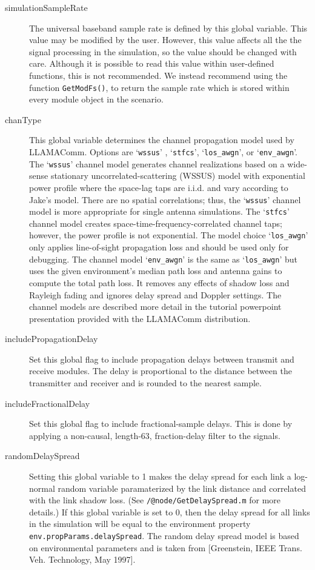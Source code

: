 \begin{description}
\item[simulationSampleRate] The universal baseband sample rate is defined by this global variable. This value may be modified by the user. However, this value affects all the the signal processing in the simulation, so the value should be changed with care. Although it is possible to read this value within user-defined functions, this is not recommended.  We instead recommend using the function \verb+GetModFs()+, to return the sample rate which is stored within every module object in the scenario.

\item[chanType] This global variable determines the channel propagation model used by LLAMAComm.  Options are `\verb+wssus+' , `\verb+stfcs+', `\verb+los_awgn+', or `\verb+env_awgn+'.  The `\verb+wssus+' channel model generates channel realizations based on a wide-sense stationary uncorrelated-scattering (WSSUS) model with exponential power profile where the space-lag taps are i.i.d. and vary according to Jake's model.  There are no spatial correlations; thus, the `\verb+wssus+' channel model is more appropriate for single antenna simulations.  The `\verb+stfcs+' channel model creates space-time-frequency-correlated channel taps; however, the power profile is not exponential.  The model choice `\verb+los_awgn+' only applies line-of-sight propagation loss and should be used only for debugging.  The channel model `\verb+env_awgn+' is the same as `\verb+los_awgn+' but uses the given environment's median path loss and antenna gains to compute the total path loss.  It removes any effects of shadow loss and Rayleigh fading and ignores delay spread and Doppler settings. The channel models are described more detail in the tutorial powerpoint presentation provided with the LLAMAComm distribution.

\item[includePropagationDelay]  Set this global flag to include propagation delays between transmit and receive modules.  The delay is proportional to the distance between the transmitter and receiver and is rounded to the nearest sample.

\item[includeFractionalDelay] Set this global flag to include fractional-sample delays.  This is done by applying a non-causal, length-63, fraction-delay filter to the signals.

\item[randomDelaySpread] Setting this global variable to 1 makes the delay spread for each link a log-normal random variable paramaterized by the link distance and correlated with the link shadow loss.  (See \verb+/@node/GetDelaySpread.m+ for more details.)  If this global variable is set to 0, then the delay spread for all links in the simulation will be equal to the environment property \verb+env.propParams.delaySpread+.  The random delay spread model is based on environmental parameters and is taken from [Greenstein, IEEE Trans. Veh. Technology, May 1997].


\end{description}
